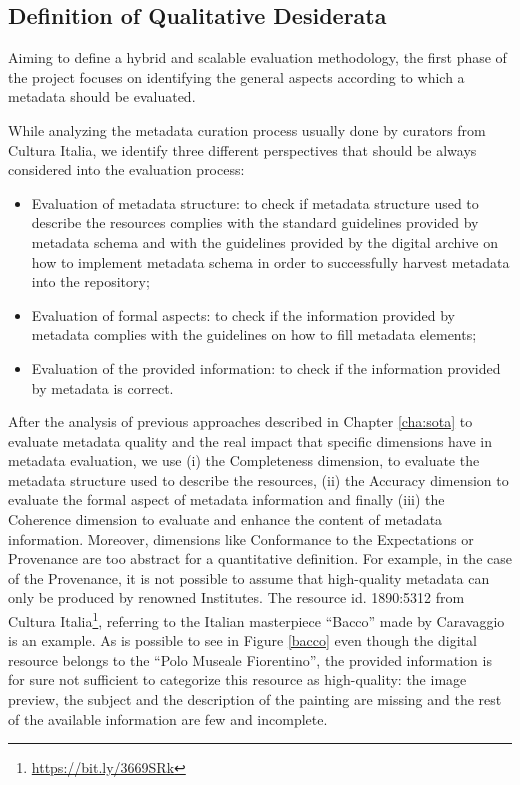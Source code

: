 \documentclass[epsfig,a4paper,12pt,titlepage]{book}
\begin{document}
\subsection{Definition of Qualitative Desiderata}
Aiming to define a hybrid and scalable evaluation methodology, the first phase of the project focuses on identifying the general aspects according to which a metadata should be evaluated.

While analyzing the metadata curation process usually done by curators from Cultura Italia, we identify three different perspectives that should be always considered into the evaluation process:

\begin{itemize}
    \item Evaluation of metadata structure: to check if metadata structure used to describe the resources complies with the standard guidelines provided by metadata schema and with the guidelines provided by the digital archive on how to implement metadata schema in order to successfully harvest metadata into the repository; 
    \item Evaluation of formal aspects: to check if the information provided by metadata complies with the guidelines on how to fill metadata elements;
    \item Evaluation of the provided information: to check if the information provided by metadata is correct.
\end{itemize}

After the analysis of previous approaches described in Chapter \ref{cha:sota} to evaluate metadata quality and the real impact that specific dimensions have in metadata evaluation, we use (i) the Completeness dimension, to evaluate the metadata structure used to describe the resources, (ii) the Accuracy dimension to evaluate the formal aspect of metadata information and finally (iii) the Coherence dimension to evaluate and enhance the content of metadata information. Moreover, dimensions like Conformance to the Expectations or Provenance are too abstract for a quantitative definition. For example, in the case of the Provenance, it is not possible to assume that high-quality metadata can only be produced by renowned Institutes. The resource id. 1890:5312  from Cultura Italia\footnote{\url{https://bit.ly/3669SRk}}, referring to the Italian masterpiece ``Bacco'' made by Caravaggio is an example. As is possible to see in Figure \ref{bacco} even though the digital resource belongs to the ``Polo Museale Fiorentino'', the provided information is for sure not sufficient to categorize this resource as high-quality: the image preview, the subject and the description of the painting are missing and the rest of the available information are few and incomplete. 
\end{document}
